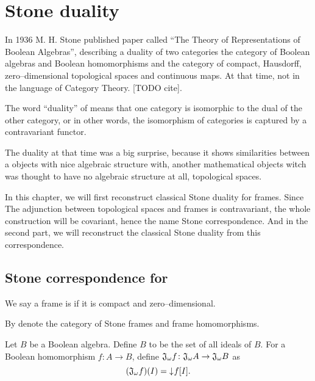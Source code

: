 \chapter{Stone duality}

In 1936 M. H. Stone published paper called ``The Theory of Representations of Boolean Algebras'', describing a duality of two categories the category of Boolean algebras and Boolean homomorphisms and the category of compact, Hausdorff, zero--dimensional topological spaces and continuous maps. At that time, not in the language of Category Theory. [TODO cite].

The word ``duality'' of means that one category is isomorphic to the dual of the other category, or in other words, the isomorphism of categories is captured by a contravariant functor.

The duality at that time was a big surprise, because it shows similarities between a objects with nice algebraic structure with, another mathematical objects witch was thought to have no algebraic structure at all, topological spaces.

In this chapter, we will first reconstruct classical Stone duality for frames. Since The adjunction between topological spaces and frames is contravariant, the whole construction will be covariant, hence the name Stone correspondence. And in the second part, we will reconstruct the classical Stone duality from this correspondence.

\section{Stone correspondence for \StoneFrm}

\begin{definition}
    We say a frame is  if it is compact and zero--dimensional.

    By \DEF{\StoneFrm{}} denote the category of Stone frames and frame homomorphisms.
\end{definition}

\begin{definition}
    Let $B$ be a Boolean algebra. Define $B$ to be the set of all ideals of $B$.
    For a Boolean homomorphism $f\colon A \to B$, define $\mathfrak{J}_{\omega} f\colon \mathfrak{J}_{\omega} A \to \mathfrak{J}_{\omega} B$ as
    $$(\mathfrak{J}_{\omega} f)(I) = \mathord{\downarrow}\mkern1mu f[I].$$
\end{definition}

